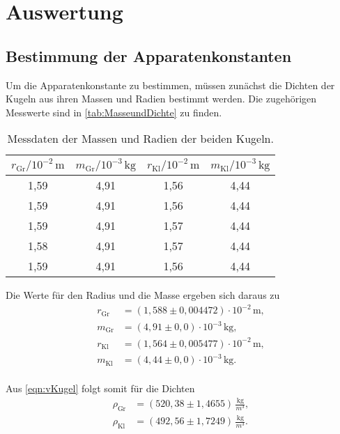 \section{Auswertung}
\label{sec:Auswertung}

\subsection{Bestimmung der Apparatenkonstanten}
Um die Apparatenkonstante zu bestimmen, müssen zunächst die Dichten der Kugeln aus ihren Massen und Radien bestimmt werden. Die zugehörigen Messwerte sind
in \autoref{tab:MasseundDichte} zu finden.

\begin{table}[H]
  \centering
  \caption{Messdaten der Massen und Radien der beiden Kugeln.}
  \label{tab:MasseundDichte}
  \begin{tabular}{c c c c}
    \toprule
    $r_{\text{Gr}}/10^{-2}\,\si{\meter}$ & $m_{\text{Gr}}/10^{-3}\,\si{\kilogram}$ & $r_{\text{Kl}}/10^{-2}\,\si{\meter}$ & $m_{\text{Kl}}/10^{-3}\,\si{\kilogram}$ \\
    \midrule
    1,59 & 4,91 & 1,56 & 4,44 \\
    1,59 & 4,91 & 1,56 & 4,44 \\
    1,59 & 4,91 & 1,57 & 4,44 \\
    1,58 & 4,91 & 1,57 & 4,44 \\
    1,59 & 4,91 & 1,56 & 4,44 \\
    \bottomrule
  \end{tabular}
\end{table}

Die Werte für den Radius und die Masse ergeben sich daraus zu
\begin{align*}
  r_{\text{Gr}} &= (1,588\pm 0,004472) \cdot 10^{-2} \,\si{\meter}, \\
  m_{\text{Gr}} &= (4,91\pm 0,0) \cdot 10^{-3} \,\si{\kilogram}, \\
  r_{\text{Kl}} &= (1,564\pm 0,005477) \cdot 10^{-2} \,\si{\meter}, \\
  m_{\text{Kl}} &= (4,44\pm 0,0) \cdot 10^{-3} \,\si{\kilogram}. \\
\end{align*}

Aus \autoref{eqn:vKugel} folgt somit für die Dichten
\begin{align*}
  \rho_{\text{Gr}} &= (520,38\pm 1,4655) \,\frac{\si{\kg}}{\si{m^3}}, \\
  \rho_{\text{Kl}} &= (492,56\pm 1,7249) \,\frac{\si{\kg}}{\si{m^3}}. \\
\end{align*}

